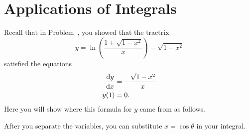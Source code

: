 \chapter{Applications of Integrals}
\label{cha:appl-integr}
\aptta{}
\endaptta{}

\begin{embeddedproblem}{}
  Recall that in Problem~\label{prob:tractrix}, you showed that the tractrix
  $$
  y=\ln\left(\frac{1+\sqrt{1-x^2}}{x}\right)-\sqrt{1-x^2}
  $$
satisfied the equations
    \begin{align*}
      \frac{\text{d}{y}}{\text{d}{x}}&=-\frac{\sqrt{1-x^2}}{x}\\
      y(1)&=0.
    \end{align*}
Here you will show where this formula for $y$ came from as follows.

After you separate the variables, you can substitute $x= \cos\theta$ in your integral.
\end{embeddedproblem}

